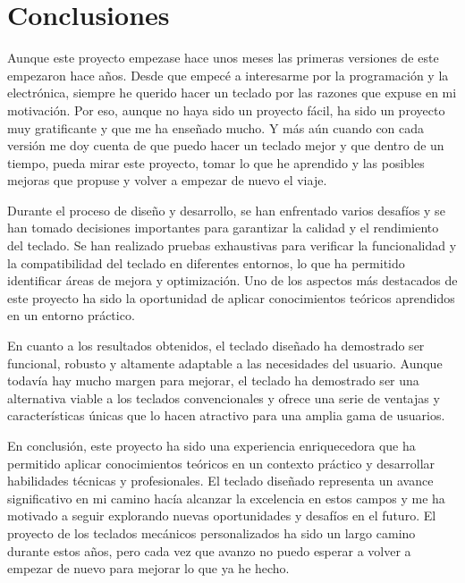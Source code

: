 \chapter{Conclusiones}

Aunque este proyecto empezase hace unos meses las primeras versiones de este empezaron hace años. Desde que empecé a interesarme por la programación y la electrónica, siempre he querido hacer un teclado por las razones que expuse en mi motivación. Por eso, aunque no haya sido un proyecto fácil, ha sido un proyecto muy gratificante y que me ha enseñado mucho. Y más aún cuando con cada versión me doy cuenta de que puedo hacer un teclado mejor y que dentro de un tiempo, pueda mirar este proyecto, tomar lo que he aprendido y las posibles mejoras que propuse y volver a empezar de nuevo el viaje.

Durante el proceso de diseño y desarrollo, se han enfrentado varios desafíos y se han tomado decisiones importantes para garantizar la calidad y el rendimiento del teclado. Se han realizado pruebas exhaustivas para verificar la funcionalidad y la compatibilidad del teclado en diferentes entornos, lo que ha permitido identificar áreas de mejora y optimización. Uno de los aspectos más destacados de este proyecto ha sido la oportunidad de aplicar conocimientos teóricos aprendidos en un entorno práctico.

En cuanto a los resultados obtenidos, el teclado diseñado ha demostrado ser funcional, robusto y altamente adaptable a las necesidades del usuario. Aunque todavía hay mucho margen para mejorar, el teclado ha demostrado ser una alternativa viable a los teclados convencionales y ofrece una serie de ventajas y características únicas que lo hacen atractivo para una amplia gama de usuarios.

En conclusión, este proyecto ha sido una experiencia enriquecedora que ha permitido aplicar conocimientos teóricos en un contexto práctico y desarrollar habilidades técnicas y profesionales. El teclado diseñado representa un avance significativo en mi camino hacía alcanzar la excelencia en estos campos y me ha motivado a seguir explorando nuevas oportunidades y desafíos en el futuro. El proyecto de los teclados mecánicos personalizados ha sido un largo camino durante estos años, pero cada vez que avanzo no puedo esperar a volver a empezar de nuevo para mejorar lo que ya he hecho.

